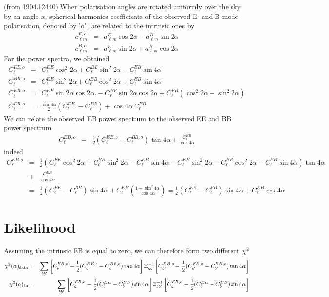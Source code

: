 \documentclass[a4paper, 11pt]{article}
\def\ba{\begin{eqnarray}}
\def\ea{\end{eqnarray}}
\begin{document}
(from 1904.12440)
When polarisation angles are rotated uniformly over the sky by an angle $\alpha$, spherical harmonics coefficients of the observed E- and B-mode polarisation, denoted by "o", are related
to the intrinsic ones by
\ba
a_{\ell m}^{E, o} &=& a_{\ell m}^{E} \cos 2\alpha - a_{\ell m}^{B} \sin 2\alpha  \nonumber \\
a_{\ell m}^{B, o} &=& a_{\ell m}^{E} \sin 2\alpha + a_{\ell m}^{B} \cos 2\alpha
\ea
For the power spectra, we obtained
\ba
C^{EE,o}_{\ell} &=&  C^{EE}_{\ell} \cos^{2} 2\alpha + C^{BB}_{\ell} \sin^{2} 2\alpha -  C^{EB}_{\ell} \sin 4\alpha \nonumber \\
C^{BB,o}_{\ell} &=&  C^{EE}_{\ell} \sin^{2} 2\alpha + C^{BB}_{\ell} \cos^{2} 2\alpha + C^{EB}_{\ell} \sin 4\alpha \nonumber \\
C^{EB,o}_{\ell} &=&  C^{EE}_{\ell} \sin 2\alpha  \cos 2\alpha. - C^{BB}_{\ell} \sin 2\alpha  \cos 2\alpha + C^{EB}_{\ell}(\cos^{2} 2\alpha - \sin^{2} 2\alpha) \nonumber \\
C^{EB,o}_{\ell} &=&  \frac{\sin 4 \alpha}{2} (C^{EE}_{\ell} . - C^{BB}_{\ell} ) + \cos 4\alpha \ C^{EB}_{\ell}
\ea
We can relate the observed EB power spectrum to the observed EE and BB power spectrum
\ba
C^{EB,o}_{\ell} &=&  \frac{1}{2} ( C^{EE,o}_{\ell} - C^{BB,o}_{\ell} ) \tan 4\alpha  + \frac{ C^{EB}_{\ell}}{\cos 4 \alpha}
\ea
indeed
\ba
C^{EB,o}_{\ell} &=&  \frac{1}{2} ( C^{EE}_{\ell} \cos^{2} 2\alpha + C^{BB}_{\ell} \sin^{2} 2\alpha -  C^{EB}_{\ell} \sin 4\alpha - C^{EE}_{\ell} \sin^{2} 2\alpha - C^{BB}_{\ell} \cos^{2} 2\alpha - C^{EB}_{\ell} \sin 4\alpha \nonumber) \tan 4\alpha  \nonumber \\
 &+& \frac{ C^{EB}_{\ell}}{\cos 4 \alpha} \nonumber \\
&=&   \frac{1}{2} ( C^{EE}_{\ell}  - C^{BB}_{\ell} ) \sin 4\alpha + C^{EB}_{\ell}  (\frac{1 - \sin^{2}  4 \alpha}{\cos 4 \alpha} ) = \frac{1}{2} ( C^{EE}_{\ell}  - C^{BB}_{\ell} ) \sin 4\alpha + C^{EB}_{\ell}  \cos 4 \alpha  
\ea 


\section{Likelihood}


Assuming the intrinsic EB is equal to zero, we can therefore form two different $\chi^{2}$ 
\ba
\chi^{2} (\alpha)_{\rm data} &=& \sum_{bb'} \left[C^{EB,o}_{b} -  \frac{1}{2} ( C^{EE,o}_{b} - C^{BB,o}_{b} ) \tan 4\alpha \right] \Xi^{-1}_{bb'} \left[ C^{EB,o}_{b'} -  \frac{1}{2} ( C^{EE,o}_{b'} - C^{BB,o}_{b'} ) \tan 4\alpha \right] \\
\chi^{2} (\alpha)_{\rm th} &=& \sum_{bb'} \left[C^{EB, o}_{b} -  \frac{1}{2} ( C^{EE}_{b} - C^{BB}_{b} ) \sin 4\alpha \right] \Xi^{-1}_{bb'} \left[C^{EB, o}_{b} -  \frac{1}{2} ( C^{EE}_{b} - C^{BB}_{b} ) \sin 4\alpha \right]
\ea
\end{document}
